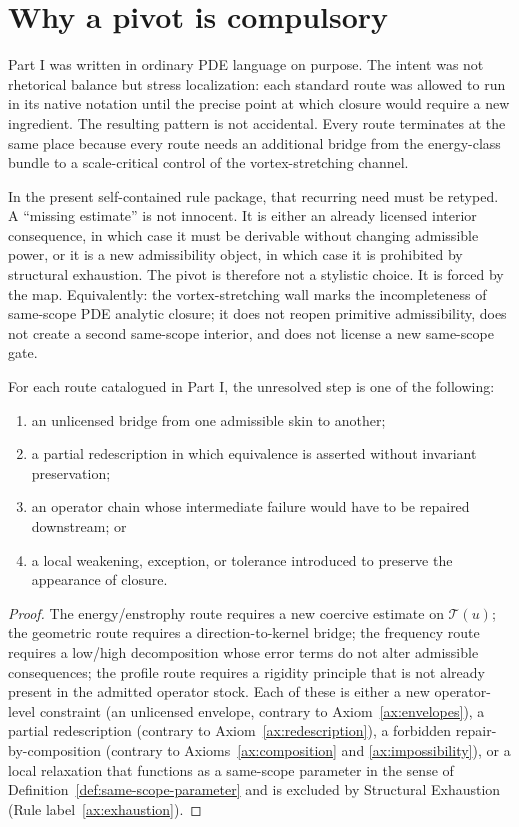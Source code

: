 \section{Why a pivot is compulsory}
Part I was written in ordinary PDE language on purpose. The intent was not rhetorical balance but
stress localization: each standard route was allowed to run in its native notation until the precise
point at which closure would require a new ingredient. The resulting pattern is not accidental.
Every route terminates at the same place because every route needs an additional bridge from the
energy-class bundle to a scale-critical control of the vortex-stretching channel.

In the present self-contained rule package, that recurring need must be retyped. A ``missing estimate'' is not
innocent. It is either an already licensed interior consequence, in which case it must be derivable
without changing admissible power, or it is a new admissibility object, in which case it is prohibited
by structural exhaustion. The pivot is therefore not a stylistic choice. It is forced by the map.
Equivalently: the vortex-stretching wall marks the incompleteness of same-scope PDE analytic closure; it does not reopen primitive admissibility, does not create a second same-scope interior, and does not license a new same-scope gate.

\begin{proposition}\label{prop:retyped-wall}
For each route catalogued in Part I, the unresolved step is one of the following:
\begin{enumerate}[label=(\roman*), leftmargin=2.2em]
\item an unlicensed bridge from one admissible skin to another;
\item a partial redescription in which equivalence is asserted without invariant preservation;
\item an operator chain whose intermediate failure would have to be repaired downstream; or
\item a local weakening, exception, or tolerance introduced to preserve the appearance of closure.
\end{enumerate}
\end{proposition}

\begin{proof}
The energy/enstrophy route requires a new coercive estimate on $\mathcal T(u)$; the geometric route
requires a direction-to-kernel bridge; the frequency route requires a low/high decomposition whose
error terms do not alter admissible consequences; the profile route requires a rigidity principle that
is not already present in the admitted operator stock. Each of these is either a new operator-level
constraint (an unlicensed envelope, contrary to Axiom~\ref{ax:envelopes}), a partial redescription (contrary to Axiom~\ref{ax:redescription}), a forbidden repair-by-composition (contrary to Axioms~\ref{ax:composition} and \ref{ax:impossibility}), or a local relaxation that functions as a same-scope parameter in the sense of Definition~\ref{def:same-scope-parameter} and is excluded by Structural Exhaustion (Rule label~\ref{ax:exhaustion}).
\end{proof}

